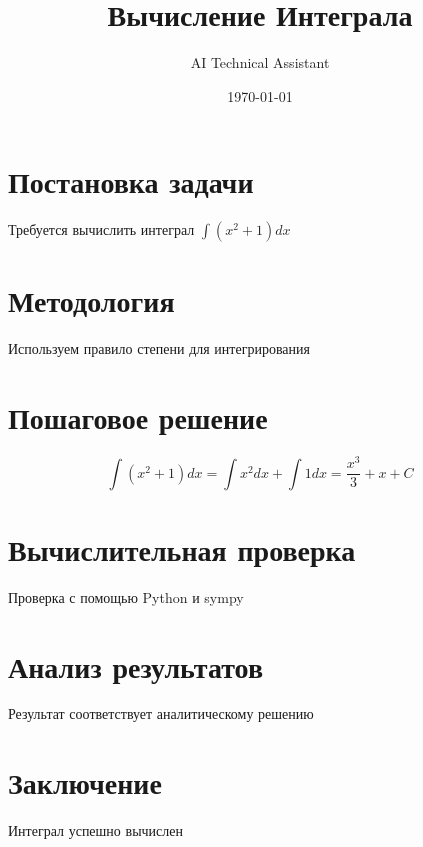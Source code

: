 \documentclass[12pt,a4paper]{article}
\title{Вычисление Интеграла}
\author{AI Technical Assistant}
\date{\today}
\begin{document}
\maketitle
\tableofcontents
\newpage

\section{Постановка задачи}
Требуется вычислить интеграл \(\int (x^2 + 1) dx\)

\section{Методология}
Используем правило степени для интегрирования

\section{Пошаговое решение}
\[\int (x^2 + 1) dx = \int x^2 dx + \int 1 dx = \frac{x^3}{3} + x + C\]

\section{Вычислительная проверка}
Проверка с помощью Python и sympy

\section{Анализ результатов}
Результат соответствует аналитическому решению

\section{Заключение}
Интеграл успешно вычислен
\end{document}
